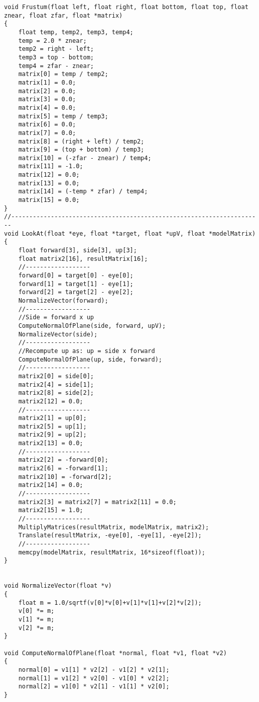 \documentclass[]{article}
\begin{document}
\begin{Verbatim}[fontsize= \footnotesize, tabsize=4]
void Frustum(float left, float right, float bottom, float top, float znear, float zfar, float *matrix)
{
	float temp, temp2, temp3, temp4;
	temp = 2.0 * znear;
	temp2 = right - left;
	temp3 = top - bottom;
	temp4 = zfar - znear;
	matrix[0] = temp / temp2;
	matrix[1] = 0.0;
	matrix[2] = 0.0;
	matrix[3] = 0.0;
	matrix[4] = 0.0;
	matrix[5] = temp / temp3;
	matrix[6] = 0.0;
	matrix[7] = 0.0;
	matrix[8] = (right + left) / temp2;
	matrix[9] = (top + bottom) / temp3;
	matrix[10] = (-zfar - znear) / temp4;
	matrix[11] = -1.0;
	matrix[12] = 0.0;
	matrix[13] = 0.0;
	matrix[14] = (-temp * zfar) / temp4;
	matrix[15] = 0.0;
}
//----------------------------------------------------------------------
void LookAt(float *eye, float *target, float *upV, float *modelMatrix)
{
	float forward[3], side[3], up[3];
	float matrix2[16], resultMatrix[16];
	//------------------
	forward[0] = target[0] - eye[0];
	forward[1] = target[1] - eye[1];
	forward[2] = target[2] - eye[2];
	NormalizeVector(forward);
	//------------------
	//Side = forward x up
	ComputeNormalOfPlane(side, forward, upV);
	NormalizeVector(side);
	//------------------
	//Recompute up as: up = side x forward
	ComputeNormalOfPlane(up, side, forward);
	//------------------
	matrix2[0] = side[0];
	matrix2[4] = side[1];
	matrix2[8] = side[2];
	matrix2[12] = 0.0;
	//------------------
	matrix2[1] = up[0];
	matrix2[5] = up[1];
	matrix2[9] = up[2];
	matrix2[13] = 0.0;
	//------------------
	matrix2[2] = -forward[0];
	matrix2[6] = -forward[1];
	matrix2[10] = -forward[2];
	matrix2[14] = 0.0;
	//------------------
	matrix2[3] = matrix2[7] = matrix2[11] = 0.0;
	matrix2[15] = 1.0;
	//------------------
	MultiplyMatrices(resultMatrix, modelMatrix, matrix2);
	Translate(resultMatrix, -eye[0], -eye[1], -eye[2]);
	//------------------
	memcpy(modelMatrix, resultMatrix, 16*sizeof(float));
}


void NormalizeVector(float *v)
{
	float m = 1.0/sqrtf(v[0]*v[0]+v[1]*v[1]+v[2]*v[2]);
	v[0] *= m;
	v[1] *= m;
	v[2] *= m;
}

void ComputeNormalOfPlane(float *normal, float *v1, float *v2)
{
	normal[0] = v1[1] * v2[2] - v1[2] * v2[1];
	normal[1] = v1[2] * v2[0] - v1[0] * v2[2];
	normal[2] = v1[0] * v2[1] - v1[1] * v2[0];
}


\end{Verbatim}
\end{document}
